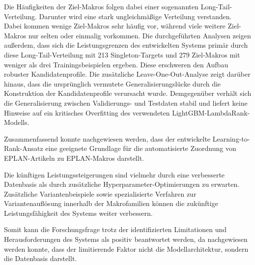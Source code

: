 Die Häufigkeiten der Ziel-Makros folgen dabei einer sogenannten Long-Tail-Verteilung. Darunter wird eine stark ungleichmäßige Verteilung verstanden. Dabei kommen wenige Ziel-Makros sehr häufig vor, während viele weitere Ziel-Makros nur selten oder einmalig vorkommen. 
Die durchgeführten Analysen zeigen außerdem, dass sich die Leistungsgrenzen des entwickelten Systems primär durch diese Long-Tail-Verteilung mit 213 Singleton-Targets und 279 Ziel-Makros \parencite{EPLAN-Makros} mit weniger als drei Trainingsbeispielen ergeben.
Diese erschweren den Aufbau robuster Kandidatenprofile. Die zusätzliche Leave-One-Out-Analyse zeigt darüber hinaus, dass die ursprünglich vermutete Generalisierungslücke durch die Konstruktion der Kandidatenprofile verursacht wurde.
Demgegenüber verhält sich die Generalisierung zwischen Validierungs- und Testdaten stabil und liefert keine Hinweise auf ein kritisches Overfitting des verwendeten LightGBM-LambdaRank-Modells.


Zusammenfassend konnte nachgewiesen werden, dass der entwickelte Learning-to-Rank-Ansatz eine geeignete Grundlage für die automatisierte Zuordnung von EPLAN-Artikeln \parencite{EPLANArtikelverwaltung} zu EPLAN-Makros \parencite{EPLAN-Makros} darstellt.

Die künftigen Leistungssteigerungen sind vielmehr durch eine verbesserte Datenbasis als durch zusätzliche Hyperparameter-Optimierungen zu erwarten. 
Zusätzliche Variantenbeispiele sowie spezialisierte Verfahren zur Variantenauflösung innerhalb der Makrofamilien können die zukünftige Leistungsfähigkeit des Systems weiter verbessern.

Somit kann die Forschungsfrage trotz der identifizierten Limitationen und Herausforderungen des Systems als positiv beantwortet werden, da nachgewiesen werden konnte,
dass der limitierende Faktor nicht die Modellarchitektur, sondern die Datenbasis darstellt.